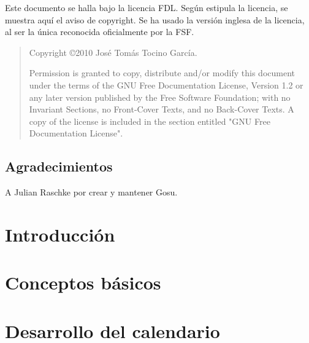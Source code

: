 \documentclass[a4paper,12pt]{scrbook}
\begin{document}




\cleardoublepage



\cleardoublepage
\bigskip
\bigskip

Este documento se halla bajo la licencia \ac{FDL}. Según estipula la
licencia, se muestra aquí el aviso de copyright. Se ha usado la
versión inglesa de la licencia, al ser la única reconocida
oficialmente por la \ac{FSF}.

\begin{quote}
  Copyright \copyright  2010 José Tomás Tocino García.
  
  Permission is granted to copy, distribute and/or modify this document
  under the terms of the GNU Free Documentation License, Version 1.2
  or any later version published by the Free Software Foundation;
  with no Invariant Sections, no Front-Cover Texts, and no Back-Cover Texts.
  A copy of the license is included in the section entitled "GNU
  Free Documentation License".
\end{quote}

\cleardoublepage

\section*{Agradecimientos}

A Julian Raschke por crear y mantener Gosu.

\cleardoublepage

\tableofcontents
\listoffigures
\listoftables

\setlength{\parskip}{1.2ex plus 0.5ex minus 0.2ex}

\chapter{Introducción}


\chapter{Conceptos básicos}


\chapter{Desarrollo del calendario}

 
\end{document}
